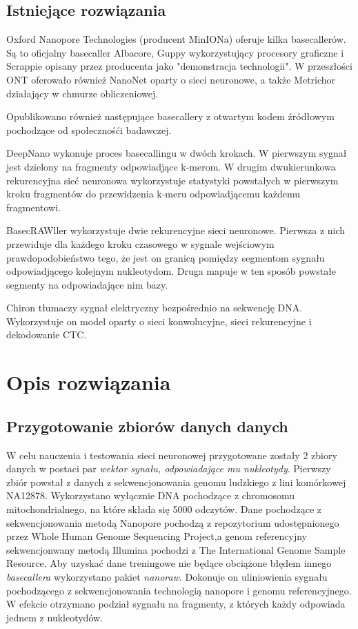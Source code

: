 \documentclass[a4paper,11pt,twoside]{report}
\theoremstyle{definition}
\begin{document}
\section*{Istniejące rozwiązania}

Oxford Nanopore Technologies (producent MinIONa) oferuje kilka basecallerów. Są to oficjalny basecaller Albacore, Guppy wykorzystujący procesory graficzne i Scrappie opisany przez producenta jako "demonstracja technologii". W przeszłości ONT oferowało również NanoNet oparty o sieci neuronowe, a także Metrichor działający w chmurze obliczeniowej.

Opublikowano również następujące basecallery z otwartym kodem źródłowym pochodzące od społecznośći badawczej.

DeepNano\cite{deepNano} wykonuje proces basecallingu w dwóch krokach. W pierwszym sygnał jest dzielony na fragmenty odpowiadjące k-merom. W drugim dwukierunkowa rekurencyjna sieć neuronowa wykorzystuje statystyki powstałych w pierwszym kroku fragmentów do przewidzenia k-meru odpowiadjącemu każdemu fragmentowi. 

BasecRAWller\cite{basecrawler} wykorzystuje dwie rekurencyjne sieci neuronowe. Pierwsza z nich przewiduje dla każdego kroku czasowego w sygnale wejściowym prawdopodobieństwo tego, że jest on granicą pomiędzy segmentom sygnału odpowiadjącego kolejnym nukleotydom. Druga mapuje w ten sposób powstałe segmenty na odpowiadające nim bazy.

Chiron\cite{chiron} tłumaczy sygnał elektryczny bezpośrednio na sekwencję DNA. Wykorzystuje on model oparty o sieci konwolucyjne, sieci rekurencyjne i dekodowanie CTC.
\chapter*{Opis rozwiązania}

\section*{Przygotowanie zbiorów danych danych}

W celu nauczenia i testowania sieci neuronowej przygotowane zostały 2 zbiory danych w postaci par \textit{wektor synału, odpowiadające mu nukleotydy}.
Pierwszy zbiór powstał z danych z sekwencjonowania genomu ludzkiego z lini komórkowej NA12878. Wykorzystano wyłącznie DNA pochodzące z chromosomu mitochondrialnego, na które składa się 5000 odczytów.
Dane pochodzące z sekwencjonowania metodą Nanopore pochodzą z repozytorium udostępnionego przez Whole Human Genome Sequencing Project\cite{nanoporeHuman},a genom referencyjny sekwencjonwany metodą Illumina pochodzi z The International Genome Sample Resource\cite{refGenome}. Aby uzyskać dane treningowe nie będące obciążone błędem innego \textit{basecallera} wykorzystano pakiet \textit{nanoraw}\cite{nanoraw}. Dokonuje on uliniowienia sygnału pochodzącego z sekwencjonowania technologią nanopore i genomu referencyjnego. W efekcie otrzymano podział sygnału na fragmenty, z których każdy odpowiada jednem z nukleotydów.
\end{document}
